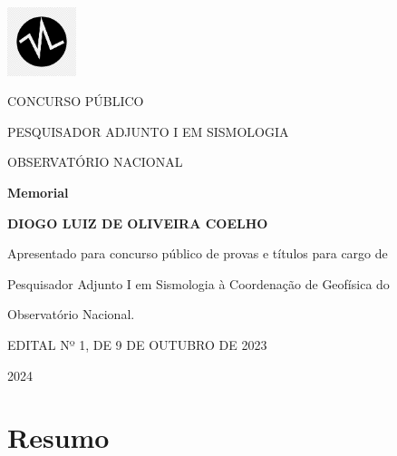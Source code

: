 \documentclass[10pt,a4paper,oneside]{book}
\newcommand{\Year}{2024}
\newcommand{\Author}{Diogo Luiz de Oliveira Coelho}
\begin{document}
\pagestyle{plain}
\frontmatter

\begin{titlepage}
  \begin{center}
    \includegraphics[height=2cm]{images/logo_seismo.png}
    \vspace{1cm}

    CONCURSO PÚBLICO
    
    PESQUISADOR ADJUNTO I EM SISMOLOGIA
    
    OBSERVATÓRIO NACIONAL

    \vspace{5cm}

    \textbf{\LARGE Memorial}
    \vspace{1cm}

    \textbf{\LARGE \MakeUppercase{\Author{}}}
    \vspace{5cm}

    {\small
	Apresentado para concurso público de provas e títulos para cargo de

	Pesquisador Adjunto I em Sismologia à Coordenação de Geofísica do

	Observatório Nacional.
      \vspace{1cm}

	EDITAL Nº 1, DE 9 DE OUTUBRO DE 2023
    }
    \vfill

    \Year{}
  \end{center}
\end{titlepage}

\chapter*{Resumo}
\end{document}
